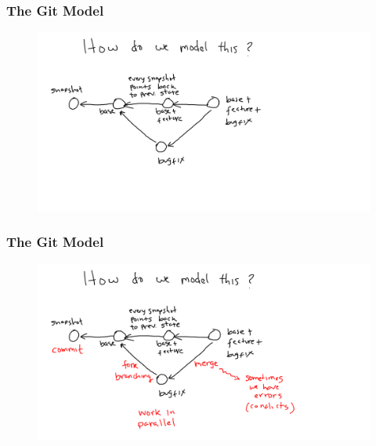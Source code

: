 \documentclass[11pt]{beamer}
\begin{document}
\begin{frame}[fragile]
\frametitle{The Git Model}

\begin{figure}[htp]
 \centering
 \includegraphics[scale=0.2]{git_model2b.png}
\end{figure}

\end{frame}



\begin{frame}[fragile]
\frametitle{The Git Model}

\begin{figure}[htp]
 \centering
 \includegraphics[scale=0.2]{git_model2.png}
\end{figure}

\end{frame}



\end{document}
